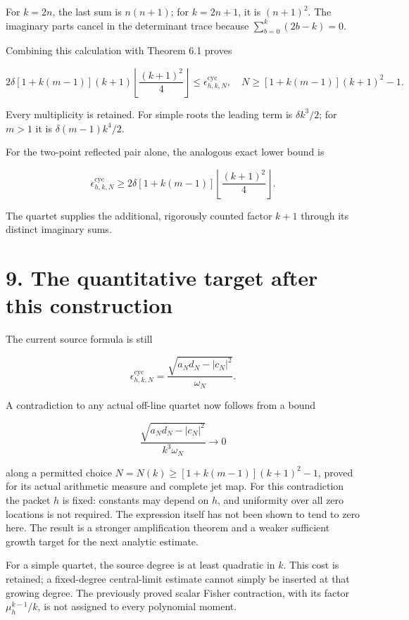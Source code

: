 \documentclass[
  11pt,
]{article}
\begin{document}
For \(k=2n\), the last sum is \(n(n+1)\); for \(k=2n+1\), it is
\((n+1)^2\). The imaginary parts cancel in the determinant trace because
\(\sum_{b=0}^k(2b-k)=0\).

Combining this calculation with Theorem 6.1 proves

\[
\boxed{
2\delta[1+k(m-1)](k+1)
\left\lfloor\frac{(k+1)^2}{4}\right\rfloor
\leq\epsilon_{h,k,N}^{\mathrm{cyc}},
\quad N\geq[1+k(m-1)](k+1)^2-1.
}
\]

Every multiplicity is retained. For simple roots the leading term is
\(\delta k^3/2\); for \(m>1\) it is \(\delta(m-1)k^4/2\).

For the two-point reflected pair alone, the analogous exact lower bound
is

\[
\epsilon_{h,k,N}^{\mathrm{cyc}}
\geq2\delta[1+k(m-1)]
\left\lfloor\frac{(k+1)^2}{4}\right\rfloor.
\]

The quartet supplies the additional, rigorously counted factor \(k+1\)
through its distinct imaginary sums.

\section{9. The quantitative target after this
construction}\label{the-quantitative-target-after-this-construction}

The current source formula is still

\[
\epsilon_{h,k,N}^{\mathrm{cyc}}
=\frac{\sqrt{a_Nd_N-|c_N|^2}}{\omega_N}.
\]

A contradiction to any actual off-line quartet now follows from a bound

\[
\boxed{
\frac{\sqrt{a_Nd_N-|c_N|^2}}{k^3\omega_N}\longrightarrow0
}
\]

along a permitted choice \(N=N(k)\geq[1+k(m-1)](k+1)^2-1\), proved for
its actual arithmetic measure and complete jet map. For this
contradiction the packet \(h\) is fixed: constants may depend on \(h\),
and uniformity over all zero locations is not required. The expression
itself has not been shown to tend to zero here. The result is a stronger
amplification theorem and a weaker sufficient growth target for the next
analytic estimate.

For a simple quartet, the source degree is at least quadratic in \(k\).
This cost is retained; a fixed-degree central-limit estimate cannot
simply be inserted at that growing degree. The previously proved scalar
Fisher contraction, with its factor \(\mu_h^{k-1}/k\), is not assigned
to every polynomial moment.
\end{document}
